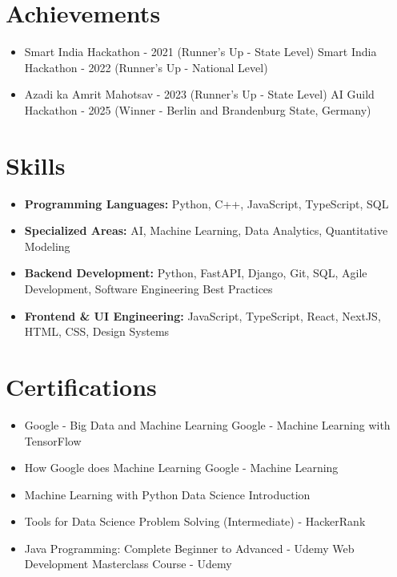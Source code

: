 \documentclass[a4paper,10pt]{article}
\begin{document}
\section*{Achievements}
\begin{itemize}
\item Smart India Hackathon - 2021 (Runner's Up - State Level) \hfill Smart India Hackathon - 2022 (Runner's Up - National Level)
\item Azadi ka Amrit Mahotsav - 2023 (Runner's Up - State Level) \hfill AI Guild Hackathon - 2025 (Winner - Berlin and Brandenburg State, Germany)
\end{itemize}

\section*{Skills}
\begin{itemize}
  \item \textbf{Programming Languages:} Python, C++, JavaScript, TypeScript, SQL
  \item \textbf{Specialized Areas:} AI, Machine Learning, Data Analytics, Quantitative Modeling
  \item \textbf{Backend Development:} Python, FastAPI, Django, Git, SQL, Agile Development, Software Engineering Best Practices
  \item \textbf{Frontend \& UI Engineering:} JavaScript, TypeScript, React, NextJS, HTML, CSS, Design Systems
\end{itemize}

\section*{Certifications}
\begin{itemize}
\item Google - Big Data and Machine Learning \hfill Google - Machine Learning with TensorFlow
\item How Google does Machine Learning \hfill Google - Machine Learning
\item Machine Learning with Python \hfill Data Science Introduction
\item Tools for Data Science \hfill Problem Solving (Intermediate) - HackerRank
\item Java Programming: Complete Beginner to Advanced - Udemy \hfill Web Development Masterclass Course - Udemy
\end{itemize}
\end{document}
